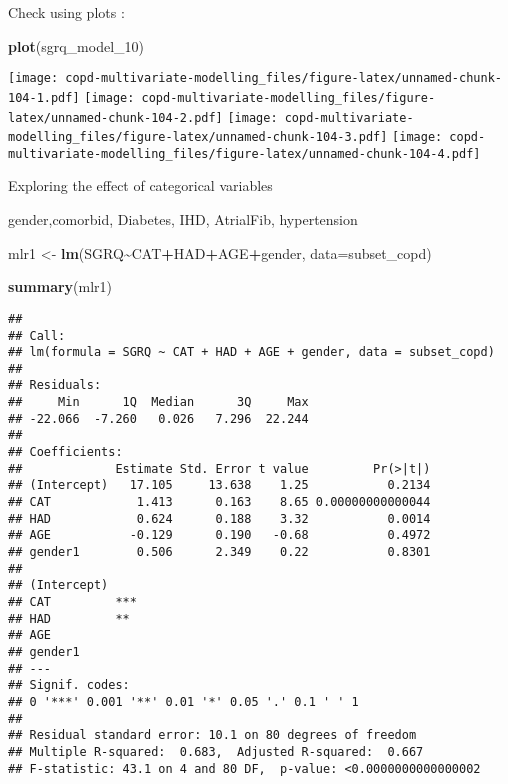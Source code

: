 \documentclass[
]{article}
\newenvironment{Shaded}{\begin{snugshade}}{\end{snugshade}}
\newcommand{\AttributeTok}[1]{\textcolor[rgb]{0.13,0.29,0.53}{#1}}
\newcommand{\FunctionTok}[1]{\textcolor[rgb]{0.13,0.29,0.53}{\textbf{#1}}}
\newcommand{\NormalTok}[1]{#1}
\newcommand{\OtherTok}[1]{\textcolor[rgb]{0.56,0.35,0.01}{#1}}
\newcommand{\SpecialCharTok}[1]{\textcolor[rgb]{0.81,0.36,0.00}{\textbf{#1}}}
\begin{document}
Check using plots :

\begin{Shaded}
\begin{Highlighting}[]
\FunctionTok{plot}\NormalTok{(sgrq\_model\_10)}
\end{Highlighting}
\end{Shaded}

\texttt{[image: copd-multivariate-modelling\_files/figure-latex/unnamed-chunk-104-1.pdf]}
\texttt{[image: copd-multivariate-modelling\_files/figure-latex/unnamed-chunk-104-2.pdf]}
\texttt{[image: copd-multivariate-modelling\_files/figure-latex/unnamed-chunk-104-3.pdf]}
\texttt{[image: copd-multivariate-modelling\_files/figure-latex/unnamed-chunk-104-4.pdf]}

Exploring the effect of categorical variables

gender,comorbid, Diabetes, IHD, AtrialFib, hypertension

\begin{Shaded}
\begin{Highlighting}[]
\NormalTok{mlr1 }\OtherTok{\textless{}{-}} \FunctionTok{lm}\NormalTok{(SGRQ}\SpecialCharTok{\textasciitilde{}}\NormalTok{CAT}\SpecialCharTok{+}\NormalTok{HAD}\SpecialCharTok{+}\NormalTok{AGE}\SpecialCharTok{+}\NormalTok{gender, }\AttributeTok{data=}\NormalTok{subset\_copd)}
\end{Highlighting}
\end{Shaded}

\begin{Shaded}
\begin{Highlighting}[]
\FunctionTok{summary}\NormalTok{(mlr1)}
\end{Highlighting}
\end{Shaded}

\begin{verbatim}
## 
## Call:
## lm(formula = SGRQ ~ CAT + HAD + AGE + gender, data = subset_copd)
## 
## Residuals:
##     Min      1Q  Median      3Q     Max 
## -22.066  -7.260   0.026   7.296  22.244 
## 
## Coefficients:
##             Estimate Std. Error t value         Pr(>|t|)
## (Intercept)   17.105     13.638    1.25           0.2134
## CAT            1.413      0.163    8.65 0.00000000000044
## HAD            0.624      0.188    3.32           0.0014
## AGE           -0.129      0.190   -0.68           0.4972
## gender1        0.506      2.349    0.22           0.8301
##                
## (Intercept)    
## CAT         ***
## HAD         ** 
## AGE            
## gender1        
## ---
## Signif. codes:  
## 0 '***' 0.001 '**' 0.01 '*' 0.05 '.' 0.1 ' ' 1
## 
## Residual standard error: 10.1 on 80 degrees of freedom
## Multiple R-squared:  0.683,  Adjusted R-squared:  0.667 
## F-statistic: 43.1 on 4 and 80 DF,  p-value: <0.0000000000000002
\end{verbatim}
\end{document}

